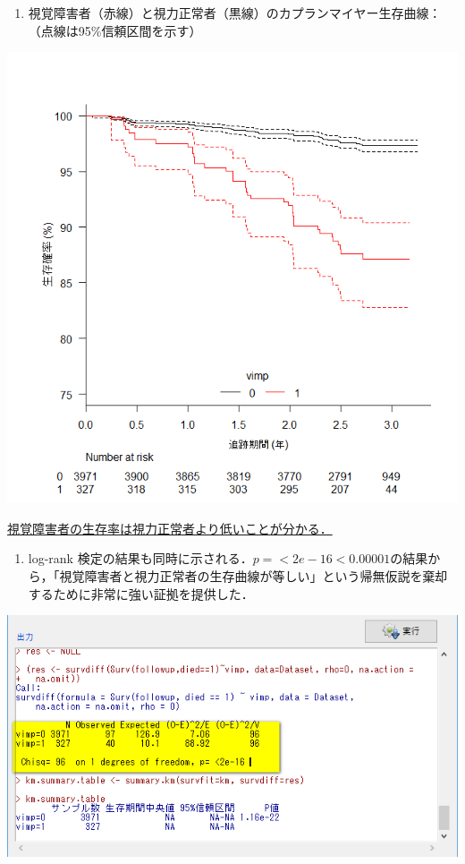 \documentclass[11pt,]{problemset}
\providecommand{\tightlist}{%
  \setlength{\itemsep}{0pt}\setlength{\parskip}{0pt}}
\begin{document}
\newpage

\begin{enumerate}
\def\labelenumi{\arabic{enumi}.}
\setcounter{enumi}{2}
\tightlist
\item
  視覚障害者（赤線）と視力正常者（黒線）のカプランマイヤー生存曲線：
  \newline（点線は95\%信頼区間を示す）
\end{enumerate}

\begin{center}\includegraphics[width=0.7\linewidth,height=0.5\textheight]{pic/survival09} \end{center}

\underline{視覚障害者の生存率は視力正常者より低いことが分かる．}

\begin{enumerate}
\def\labelenumi{\arabic{enumi}.}
\setcounter{enumi}{3}
\tightlist
\item
  log-rank
  検定の結果も同時に示される．\(p = <2e-16 < 0.00001\)の結果から，「視覚障害者と視力正常者の生存曲線が等しい」という帰無仮説を棄却するために非常に強い証拠を提供した．
\end{enumerate}

\begin{center}\includegraphics[width=0.6\linewidth,height=0.4\textheight]{pic/survival10} \end{center}
\end{document}
